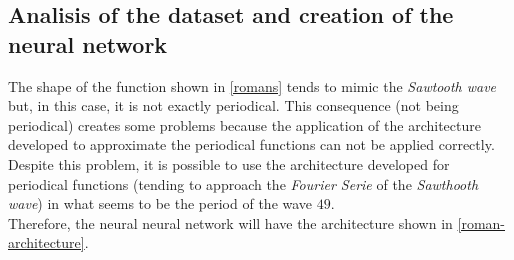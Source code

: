 \documentclass[a4paper, 11pt]{article}
\begin{document}
\subsection{Analisis of the dataset and creation of the neural network} 
The shape of the function shown in \ref{romans} tends to mimic the \textit{Sawtooth wave} but, in this case, it is not exactly periodical. This consequence (not being periodical) creates some problems because the application of the architecture developed to approximate the periodical functions can not be applied correctly.\\
Despite this problem, it is possible to use the architecture developed for periodical functions (tending to approach the \textit{Fourier Serie} of the \textit{Sawthooth wave}) in what seems to be the period of the wave $49$. \\
Therefore, the neural neural network will have the architecture shown in \ref{roman-architecture}.
\end{document}
